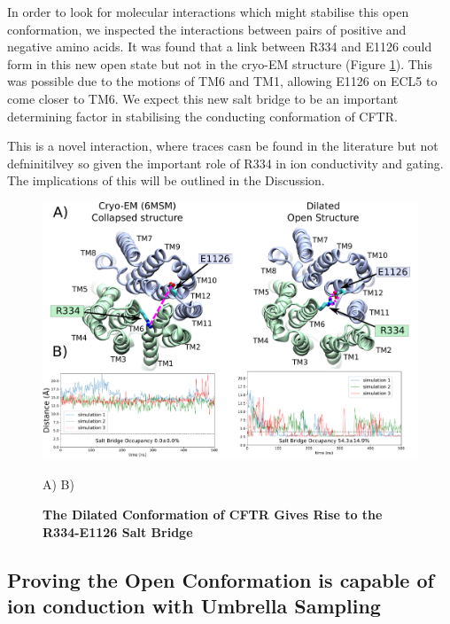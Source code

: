 In order to look for molecular interactions which might stabilise this open conformation, we inspected the interactions between pairs of positive and negative amino acids. It was found that a link between R334 and  E1126 could form in this new open state but not in the cryo-EM structure (Figure \ref{salt_bridge_fig}). This was possible due to the motions of TM6 and TM1, allowing E1126 on ECL5 to come closer to TM6. We expect this new salt bridge to be an important determining factor in stabilising the conducting conformation of CFTR.  

This is a novel interaction, where traces casn be found in the literature but not defninitilvey so given the important role of R334 in ion conductivity and gating. The implications of this will be outlined in the Discussion.

\begin{figure}
	\label{salt_bridge_fig}
	\begin{center}
		\includegraphics[width=1\textwidth]{figures/opening/salt_bridge_E1126_R334_figure.pdf}
	\end{center}
	\captionsetup{singlelinecheck = false, justification=raggedright}
	\caption[The Dilated Conformation of CFTR Gives Rise to the R334-E1126 Salt Bridge] {\textbf{The Dilated Conformation of CFTR Gives Rise to the R334-E1126 Salt Bridge}}{A) B) }
\end{figure}

\subsection{Proving the Open Conformation is capable of ion conduction with Umbrella Sampling}

